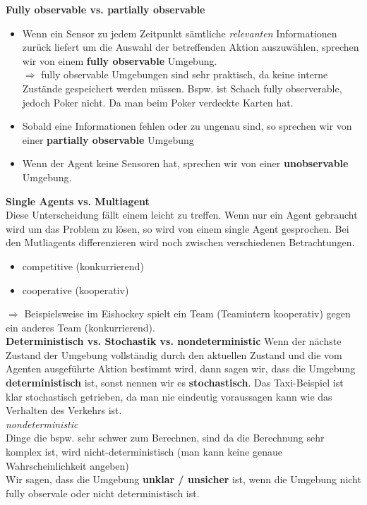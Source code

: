 \documentclass{article}
\theoremstyle{merke}
\theoremstyle{definition}
\begin{document}
\textbf{Fully observable vs. partially observable}
\begin{itemize}
\item Wenn ein Sensor zu jedem Zeitpunkt sämtliche \textit{relevanten} Informationen zurück liefert um die Auswahl der betreffenden Aktion auszuwählen, sprechen wir von einem \textbf{fully observable} Umgebung.\\
$\Rightarrow$ fully observable Umgebungen sind sehr praktisch, da keine interne Zustände gespeichert werden müssen. Bspw. ist Schach fully observerable, jedoch Poker nicht. Da man beim Poker verdeckte Karten hat.
\item Sobald eine Informationen fehlen oder zu ungenau sind, so sprechen wir von einer \textbf{partially observable} Umgebung
\item Wenn der Agent keine Sensoren hat, sprechen wir von einer \textbf{unobservable} Umgebung.
\end{itemize}

\textbf{Single Agents vs. Multiagent}\\
Diese Unterscheidung fällt einem leicht zu treffen. Wenn nur ein Agent gebraucht wird um das Problem zu lösen, so wird von einem single Agent gesprochen. Bei den Mutliagents differenzieren wird noch zwischen verschiedenen Betrachtungen. 
\begin{itemize}
\item competitive (konkurrierend)
\item cooperative (kooperativ)
\end{itemize}
$\Rightarrow$ Beispielsweise im Eishockey spielt ein Team (Teamintern kooperativ) gegen ein anderes Team (konkurrierend).\\

\textbf{Deterministisch vs. Stochastik vs. nondeterministic}
Wenn der nächste Zustand der Umgebung vollständig durch den aktuellen Zustand und die vom Agenten ausgeführte Aktion bestimmt wird, dann sagen wir, dass die Umgebung \textbf{deterministisch} ist, sonst nennen wir es \textbf{stochastisch}. Das Taxi-Beispiel ist klar stochastisch getrieben, da man nie eindeutig voraussagen kann wie das Verhalten des Verkehrs ist.\\
\textit{nondeterministic}\\
Dinge die bspw. sehr schwer zum Berechnen, sind da die Berechnung sehr komplex ist, wird nicht-deterministisch (man kann keine genaue Wahrscheinlichkeit angeben)\\
Wir sagen, dass die Umgebung \textbf{unklar / unsicher} ist, wenn die Umgebung nicht fully observale oder nicht deterministisch ist.\\
\end{document}
